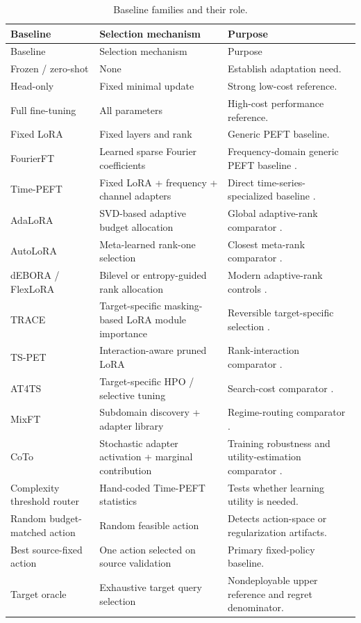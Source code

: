 \documentclass[10pt]{article}
\begin{document}
\begin{longtable}{L{0.20\textwidth}L{0.27\textwidth}L{0.43\textwidth}}
\caption{Baseline families and their role.}\label{tab:baselines}\\
\toprule
Baseline & Selection mechanism & Purpose \\
\midrule
\endfirsthead
\toprule
Baseline & Selection mechanism & Purpose \\
\midrule
\endhead
Frozen / zero-shot & None & Establish adaptation need. \\
Head-only & Fixed minimal update & Strong low-cost reference. \\
Full fine-tuning & All parameters & High-cost performance reference. \\
Fixed LoRA & Fixed layers and rank & Generic PEFT baseline. \\
FourierFT & Learned sparse Fourier coefficients & Frequency-domain generic PEFT baseline \citep{gao2024fourierft}. \\
Time-PEFT & Fixed LoRA + frequency + channel adapters & Direct time-series-specialized baseline \citep{na2026timepeft}. \\
AdaLoRA & SVD-based adaptive budget allocation & Global adaptive-rank comparator \citep{zhang2023adalora}. \\
AutoLoRA & Meta-learned rank-one selection & Closest meta-rank comparator \citep{zhang2024autolora}. \\
dEBORA / FlexLoRA & Bilevel or entropy-guided rank allocation & Modern adaptive-rank controls \citep{zangrando2025debora,liu2026flexlora}. \\
TRACE & Target-specific masking-based LoRA module importance & Reversible target-specific selection \citep{li2026trace}. \\
TS-PET & Interaction-aware pruned LoRA & Rank-interaction comparator \citep{zheng2026tspet}. \\
AT4TS & Target-specific HPO / selective tuning & Search-cost comparator \citep{tomar2025at4ts}. \\
MixFT & Subdomain discovery + adapter library & Regime-routing comparator \citep{lee2026mixft}. \\
CoTo & Stochastic adapter activation + marginal contribution & Training robustness and utility-estimation comparator \citep{zhuang2025coto}. \\
Complexity threshold router & Hand-coded Time-PEFT statistics & Tests whether learning utility is needed. \\
Random budget-matched action & Random feasible action & Detects action-space or regularization artifacts. \\
Best source-fixed action & One action selected on source validation & Primary fixed-policy baseline. \\
Target oracle & Exhaustive target query selection & Nondeployable upper reference and regret denominator. \\
\bottomrule
\end{longtable}
\end{document}
